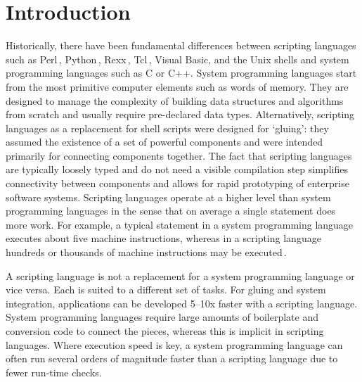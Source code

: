 \documentclass[12pt]{article}
\begin{document}

\section{Introduction}

Historically, there have been fundamental differences between
scripting languages such as
Perl\,\cite{wall99:_perl_progr_refer_guide},
Python\,\cite{martelli06:_python_nutsh},
Rexx\,\cite{o'hara88:_moder_progr_using_rexx},
Tcl\,\cite{ousterhout94:_tcl_tk_toolk}, Visual Basic, and the Unix
shells and system programming languages such as C or C++.  System
programming languages start from the most primitive computer elements
such as words of memory. They are designed to manage the complexity of
building data structures and algorithms from scratch and usually
require pre-declared data types.  Alternatively, scripting languages
as a replacement for shell scripts were designed for `gluing': they
assumed the existence of a set of powerful components and were
intended primarily for connecting components together. The fact that
scripting languages are typically loosely typed and do not need a
visible compilation step simplifies connectivity between components
and allows for rapid prototyping of enterprise software systems.
Scripting languages operate at a higher level than system programming
languages in the sense that on average a single statement does more
work. For example, a typical statement in a system programming
language executes about five machine instructions, whereas in a
scripting language hundreds or thousands of machine instructions may
be executed\,\cite{ousterhout98:_scrip}.


A scripting language is not a replacement for a system programming
language or vice versa. Each is suited to a different set of tasks.
For gluing and system integration, applications can be developed
5--10x faster with a scripting language. System programming languages
require large amounts of boilerplate and conversion code to connect
the pieces, whereas this is implicit in scripting languages. Where
execution speed is key, a system programming language can often run
several orders of magnitude faster than a scripting language due to
fewer run-time checks.
\end{document}
